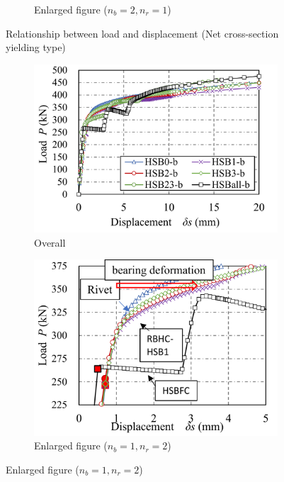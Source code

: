 \begin{figure}[htbp]
\begin{subfigure}[t]{0.48\textwidth}
    \caption{Enlarged figure ($n_b=2, n_r=1$)}
    \label{ch4fig11-c}
    \end{subfigure}
    \caption{Relationship between load and displacement (Net cross-section yielding type)}
    \label{ch4fig11}
\end{figure}

\begin{figure}[htbp]
    \centering
    \begin{subfigure}[t]{0.5\textwidth}
    \includegraphics[width=\linewidth]{imgs/ch4/fig12-a.pdf}
    \caption{Overall}
    \label{ch4fig12-a}
    \end{subfigure}
    \begin{subfigure}[t]{0.48\textwidth}
    \includegraphics[width=\linewidth]{imgs/ch4/fig12-b.pdf}
    \caption{Enlarged figure ($n_b=1, n_r=2$)}

\end{subfigure}
\end{figure}
